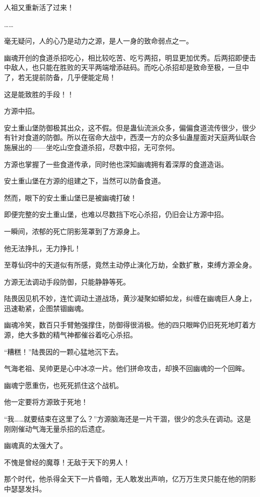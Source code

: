 \begin{this_body}
人祖又重新活了过来！

……

毫无疑问，人的心乃是动力之源，是人一身的致命弱点之一。

幽魂开创的食道杀招吃心，相比较吃苦、吃亏两招，明显更加优秀。后两招即便击中敌人，也只能在胜败的天平两端增添砝码。而吃心杀招却是致命至极，一旦中了，若无提前防备，几乎便能定局！

这是能致胜的手段！！

方源中招。

安土重山堡防御极其出众，这不假。但是蛊仙流派众多，偏偏食道流传很少，很少有针对食道的防御。所以在宿命大战中，西漠一方的众多仙蛊屋面对天庭两仙联合施展出的——坐吃山空食道杀招，尽数中招，无可奈何。

方源也掌握了一些食道传承，同时他也深知幽魂拥有着深厚的食道造诣。

安土重山堡在方源的组建之下，当然可以防备食道。

然而，眼下的安土重山堡已是被幽魂打破！

即便完整的安土重山堡，也难以尽数挡下吃心杀招，仍旧会让方源中招。

一瞬间，浓郁的死亡阴影笼罩到了方源身上。

他无法挣扎，无力挣扎！

至尊仙窍中的天道似有所感，竟然主动停止演化万劫，全数扩散，束缚方源全身。

方源无法调动手段防御，只能静静等死。

陆畏因见机不妙，连忙调动土道战场，黄沙凝聚如蟒如龙，纠缠在幽魂巨人身上，迅速勒紧，企图禁锢幽魂。

幽魂冷笑，数百只手臂勉强撑住，防御得很消极。他的四只眼眸仍旧死死地盯着方源，绝大多数的精气神都催谷着吃心杀招。

“糟糕！”陆畏因的一颗心猛地沉下去。

气海老祖、吴帅更是心中冰凉一片。他们拼命攻击，却换不回幽魂的一个回眸。

幽魂宁愿重伤，也死死抓住这个战机。

他一定要将方源致于死地！

“我……就要结束在这里了么？”方源脑海还是一片干涸，很少的念头在调动。这是刚刚催动气海无量杀招的后遗症。

幽魂真的太强大了。

不愧是曾经的魔尊！无敌于天下的男人！

那个时代，他杀得全天下一片昏暗，无人敢发出声响，亿万万生灵只能在他的阴影中瑟瑟发抖。


\end{this_body}
